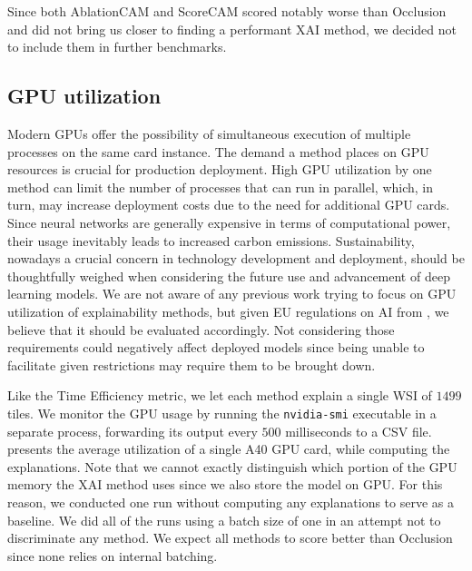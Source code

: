 Since both AblationCAM and ScoreCAM scored notably worse than Occlusion and did not bring us closer to finding a performant XAI method, we decided not to include them in further benchmarks.

\subsection*{GPU utilization}

Modern GPUs offer the possibility of simultaneous execution of multiple processes on the same card instance.
The demand a method places on GPU resources is crucial for production deployment.
High GPU utilization by one method can limit the number of processes that can run in parallel, which, in turn, may increase deployment costs due to the need for additional GPU cards.
Since neural networks are generally expensive in terms of computational power, their usage inevitably leads to increased carbon emissions.
Sustainability, nowadays a crucial concern in technology development and deployment, should be thoughtfully weighed when considering the future use and advancement of deep learning models.
We are not aware of any previous work trying to focus on GPU utilization of explainability methods, but given EU regulations on AI from , we believe that it should be evaluated accordingly.
Not considering those requirements could negatively affect deployed models since being unable to facilitate given restrictions may require them to be brought down.

Like the Time Efficiency metric, we let each method explain a single WSI of $1499$ tiles.
We monitor the GPU usage by running the \texttt{nvidia-smi} executable in a separate process, forwarding its output every $500$ milliseconds to a CSV file.
 presents the average utilization of a single A40 GPU card, while computing the explanations.
Note that we cannot exactly distinguish which portion of the GPU memory the XAI method uses since we also store the model on GPU.
For this reason, we conducted one run without computing any explanations to serve as a baseline.
We did all of the runs using a batch size of one in an attempt not to discriminate any method.
We expect all methods to score better than Occlusion since none relies on internal batching.

